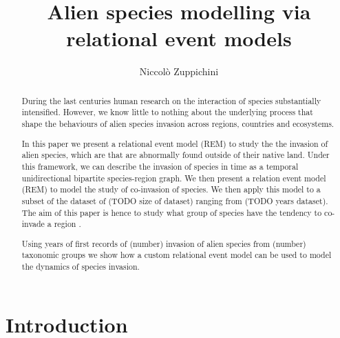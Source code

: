 \documentclass[mscthesis]{usiinfthesis}
\title{Alien species modelling via relational event models} %
\author{Niccol\`o Zuppichini} %
\begin{document}
\maketitle %

\frontmatter %

\begin{abstract}
During the last centuries human research on the interaction of species substantially intensified. However, we know little to nothing about the underlying process that shape the behaviours of alien species invasion across regions, countries and ecosystems. 

In this paper we present a relational event model (REM) to study the the invasion of alien species, which are that are abnormally found outside of their native land. 
Under this framework, we can describe the invasion of species in time as a temporal unidirectional bipartite species-region graph. We then present a relation event model (REM) to model the study of co-invasion of species. We then apply this model to a subset of the dataset of (TODO size of dataset) ranging from (TODO years dataset). The aim of this paper is hence to study what group of species have the tendency to co-invade a region
.

Using years of first records of (number) invasion of alien species from (number) taxonomic groups we show how a custom relational event model can be used to model the dynamics of species invasion.


\end{abstract}



\mainmatter

\chapter{Introduction}
\end{document}
